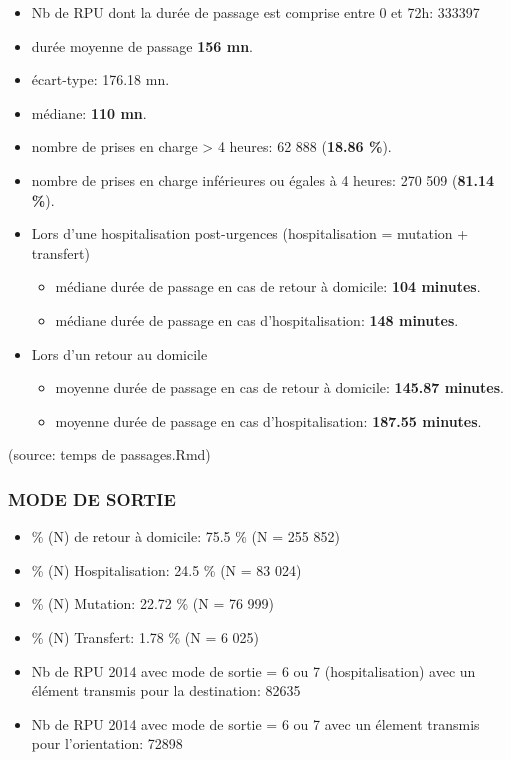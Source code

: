 \documentclass[]{article}
\begin{document}
\begin{itemize}
\item
  Nb de RPU dont la durée de passage est comprise entre 0 et 72h: 333397
\item
  durée moyenne de passage \textbf{156 mn}.
\item
  écart-type: 176.18 mn.
\item
  médiane: \textbf{110 mn}.
\item
  nombre de prises en charge \textgreater{} 4 heures: 62 888
  (\textbf{18.86 \%}).
\item
  nombre de prises en charge inférieures ou égales à 4 heures: 270 509
  (\textbf{81.14 \%}).
\item
  Lors d'une hospitalisation post-urgences (hospitalisation = mutation +
  transfert)

  \begin{itemize}
  \itemsep1pt\parskip0pt
  \item
    médiane durée de passage en cas de retour à domicile: \textbf{104
    minutes}.
  \item
    médiane durée de passage en cas d'hospitalisation: \textbf{148
    minutes}.
  \end{itemize}
\item
  Lors d'un retour au domicile

  \begin{itemize}
  \itemsep1pt\parskip0pt
  \item
    moyenne durée de passage en cas de retour à domicile: \textbf{145.87
    minutes}.
  \item
    moyenne durée de passage en cas d'hospitalisation: \textbf{187.55
    minutes}.
  \end{itemize}
\end{itemize}

(source: temps de passages.Rmd)

\subsubsection{MODE DE SORTIE}\label{mode-de-sortie}

\begin{itemize}
\itemsep1pt\parskip0pt
\item
  \% (N) de retour à domicile: 75.5 \% (N = 255 852)
\item
  \% (N) Hospitalisation: 24.5 \% (N = 83 024)
\item
  \% (N) Mutation: 22.72 \% (N = 76 999)
\item
  \% (N) Transfert: 1.78 \% (N = 6 025)
\item
  Nb de RPU 2014 avec mode de sortie = 6 ou 7 (hospitalisation) avec un
  élément transmis pour la destination: 82635
\item
  Nb de RPU 2014 avec mode de sortie = 6 ou 7 avec un élement transmis
  pour l'orientation: 72898
\end{itemize}
\end{document}
